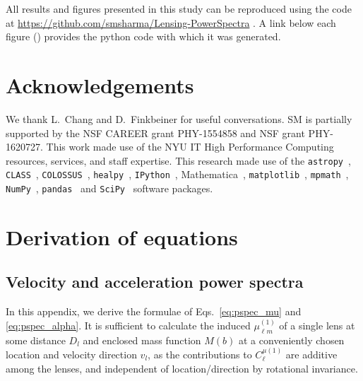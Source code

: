 \documentclass[prd,aps,10pt,nofootinbib,twocolumn,superscriptaddress,preprintnumbers,balancelastpage,longbibliography]{revtex4-1}
\begin{document}
All results and figures presented in this study can be reproduced using the code at \url{https://github.com/smsharma/Lensing-PowerSpectra} \href{https://github.com/smsharma/Lensing-PowerSpectra}{\faGithub}. A link below each figure (\faFileCodeO) provides the python code with which it was generated.

\clearpage
\section*{Acknowledgements}
We thank L.~Chang and D.~Finkbeiner for useful conversations. SM is partially supported by the NSF CAREER grant PHY-1554858 and NSF grant PHY-1620727. This work made use of the NYU IT High Performance Computing resources, services, and staff expertise.
 This research made use of the \texttt{astropy}~\cite{2013A&A...558A..33A,2018AJ....156..123A}, \texttt{CLASS}~\cite{Blas:2011rf}, \texttt{COLOSSUS}~\cite{2018ApJS..239...35D}, \texttt{healpy}~\cite{2005ApJ...622..759G}, \texttt{IPython}~\cite{PER-GRA:2007}, Mathematica~\cite{Mathematica}, \texttt{matplotlib}~\cite{Hunter:2007}, \texttt{mpmath}~\cite{mpmath}, \texttt{NumPy}~\cite{numpy:2011}, \texttt{pandas}~\cite{pandas:2010} and \texttt{SciPy}~\cite{Jones:2001ab} software packages. 

\appendix 

\section{Derivation of equations}
\label{app:derivations}

\subsection{Velocity and acceleration power spectra}
In this appendix, we derive the formulae of Eqs.~\ref{eq:pspec_mu} and \ref{eq:pspec_alpha}. It is sufficient to calculate the induced $\mu_{\ell m}^{(1)}$ of a single lens at some distance $D_l$ and enclosed mass function $M(b)$ at a conveniently chosen location and velocity direction $\hat{v}_l$, as the contributions to $C^{\mu(1)}_\ell$ are additive among the lenses, and independent of location/direction by rotational invariance.
\end{document}
